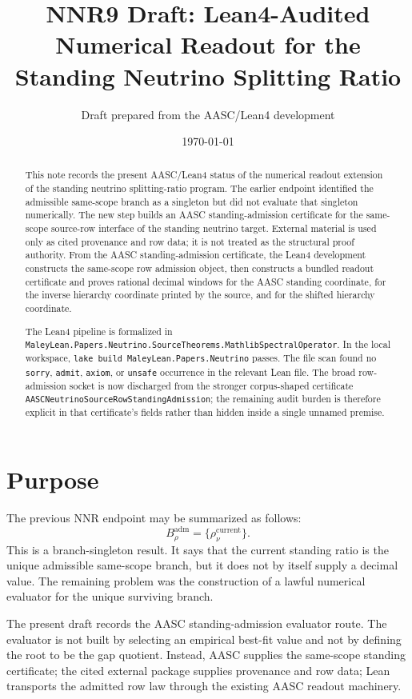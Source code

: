 \documentclass[11pt]{article}
\title{NNR9 Draft: Lean4-Audited Numerical Readout for the Standing Neutrino Splitting Ratio}
\author{Draft prepared from the AASC/Lean4 development}
\date{\today}
\begin{document}
\maketitle

\begin{abstract}
This note records the present AASC/Lean4 status of the numerical readout
extension of the standing neutrino splitting-ratio program.  The earlier
endpoint identified the admissible same-scope branch as a singleton but did
not evaluate that singleton numerically.  The new step builds an AASC
standing-admission certificate for the same-scope source-row interface of the
standing neutrino target.  External material is used only as cited provenance
and row data; it is not treated as the structural proof authority.  From the
AASC standing-admission certificate, the Lean4 development constructs the
same-scope row admission object, then constructs a bundled readout certificate
and proves rational decimal windows for the AASC standing coordinate, for the
inverse hierarchy coordinate printed by the source, and for the shifted
hierarchy coordinate.

The Lean4 pipeline is formalized in
\texttt{MaleyLean.Papers.Neutrino.SourceTheorems.MathlibSpectralOperator}.
In the local workspace, \texttt{lake build MaleyLean.Papers.Neutrino} passes.
The file scan found no \texttt{sorry}, \texttt{admit}, \texttt{axiom}, or
\texttt{unsafe} occurrence in the relevant Lean file.  The broad row-admission
socket is now discharged from the stronger corpus-shaped certificate
\texttt{AASCNeutrinoSourceRowStandingAdmission}; the remaining audit burden is
therefore explicit in that certificate's fields rather than hidden inside a
single unnamed premise.
\end{abstract}

\section{Purpose}

The previous NNR endpoint may be summarized as follows:
\[
  B_{\rho}^{\mathrm{adm}} = \{\rho_{\nu}^{\mathrm{current}}\}.
\]
This is a branch-singleton result.  It says that the current standing ratio is
the unique admissible same-scope branch, but it does not by itself supply a
decimal value.  The remaining problem was the construction of a lawful
numerical evaluator for the unique surviving branch.

The present draft records the AASC standing-admission evaluator route.  The
evaluator is not built by selecting an empirical best-fit value and not by
defining the root to be the gap quotient.  Instead, AASC supplies the
same-scope standing certificate; the cited external package supplies
provenance and row data; Lean transports the admitted row law through the
existing AASC readout machinery.
\end{document}
